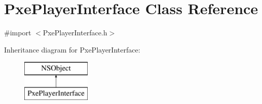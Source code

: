 \hypertarget{interface_pxe_player_interface}{\section{Pxe\-Player\-Interface Class Reference}
\label{interface_pxe_player_interface}
}


{\ttfamily \#import $<$Pxe\-Player\-Interface.\-h$>$}

Inheritance diagram for Pxe\-Player\-Interface\-:\begin{figure}[H]
\begin{center}
\leavevmode
\includegraphics[height=2.000000cm]{interface_pxe_player_interface}
\end{center}
\end{figure}
